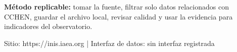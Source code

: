 \documentclass[9pt,a4paper]{extarticle}
\begin{document}
\vspace{0.06cm}
\begin{tcolorbox}[enhanced,colback=white,colframe=cchenpurple!55,boxrule=0.45pt,arc=2pt,left=6pt,right=6pt,top=5pt,bottom=5pt]
{\bfseries\color{cchenpurple}Método replicable:} tomar la fuente, filtrar solo datos relacionados con CCHEN, guardar el archivo local, revisar calidad y usar la evidencia para indicadores del observatorio.
\end{tcolorbox}

\vspace{0.02cm}
{\scriptsize\color{mutedgray}Sitio: https://inis.iaea.org \quad | \quad Interfaz de datos: sin interfaz registrada}
\end{document}
